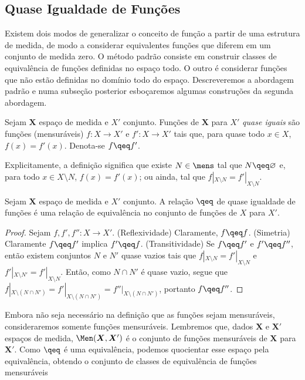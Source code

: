 \subsection{Quase Igualdade de Funções}

Existem dois modos de generalizar o conceito de função a partir de uma estrutura de medida, de modo a considerar equivalentes funções que diferem em um conjunto de medida zero. O método padrão consiste em construir classes de equivalência de funções definidas no espaço todo. O outro é considerar funções que não estão definidas no domínio todo do espaço. Descreveremos a abordagem padrão e numa subseção posterior esboçaremos algumas construções da segunda abordagem.

\begin{defi}
Sejam $\bm X$ espaço de medida e $X'$ conjunto. Funções de $\bm X$ para $X'$ \emph{quase iguais} são funções (mensuráveis) $f\colon X \to X'$ e $f'\colon X \to X'$ tais que, para quase todo $x \in X$, $f(x)=f'(x)$. Denota-se $f \qeq f'$.
\end{defi}

Explicitamente, a definição significa que existe $N \in \mens$ tal que $N \qeq \emptyset$ e, para todo $x \in X \setminus N$, $f(x)=f'(x)$; ou ainda, tal que $f|_{X \setminus N} = f'|_{X \setminus N}$.

\begin{prop}
Sejam $\bm X$ espaço de medida e $X'$ conjunto. A relação $\qeq$ de quase igualdade de funções é uma relação de equivalência no conjunto de funções de $X$ para $X'$.
\end{prop}
\begin{proof}
Sejam $f,f',f''\colon X \to X'$. (Reflexividade) Claramente, $f \qeq f$. (Simetria) Claramente $f \qeq f'$ implica $f' \qeq f$. (Transitividade) Se $f \qeq f'$ e $f' \qeq f''$, então existem conjuntos $N$ e $N'$ quase vazios tais que $f|_{X \setminus N} = f'|_{X \setminus N}$ e $f'|_{X \setminus N'} = f'|_{X \setminus N}$. Então, como $N \cap N'$ é quase vazio, segue que $f|_{X \setminus (N \cap N')} = f'|_{X \setminus (N \cap N')} = f''|_{X \setminus (N \cap N')}$, portanto $f \qeq f''$.
\end{proof}

Embora não seja necessário na definição que as funções sejam mensuráveis, consideraremos somente funções mensuráveis. Lembremos que, dados $\bm X$ e $\bm X'$ espaços de medida, $\Men(\bm X, \bm X')$ é o conjunto de funções mensuráveis de $\bm X$ para $\bm X'$. Como $\qeq$ é uma equivalência, podemos quocientar esse espaço pela equivalência, obtendo o conjunto de classes de equivalência de funções mensuráveis

